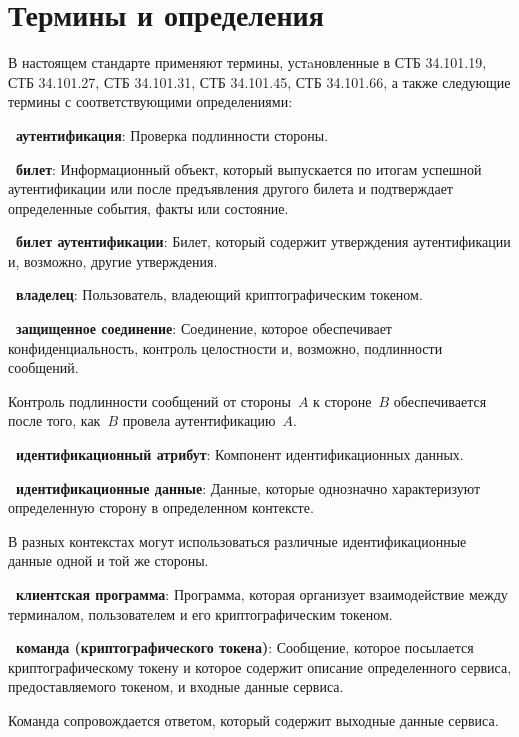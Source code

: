 \chapter{Термины и определения}\label{TERMS}

В настоящем стандарте применяют термины, устaновленные 
в СТБ 34.101.19, СТБ 34.101.27, СТБ 34.101.31, СТБ 34.101.45, 
СТБ 34.101.66, а также следующие термины с соответствующими определениями:

{\bf \thedefctr~аутентификация}:
Проверка подлинности стороны.

{\bf \thedefctr~билет}:
Информационный объект, который выпускается по итогам успешной аутентификации
или после предъявления другого билета и подтверждает определенные 
события, факты или состояние. 

{\bf \thedefctr~билет аутентификации}:
Билет, который содержит утверждения аутентификации и, возможно, другие 
утверждения. 

{\bf \thedefctr~владелец}:
Пользователь, владеющий криптографическим токеном.

{\bf \thedefctr~защищенное соединение}:
Соединение, которое обеспечивает конфиденциальность, 
контроль целостности и, возможно, подлинности сообщений. 

\begin{note*}
Контроль подлинности сообщений от стороны~$A$ к стороне~$B$ 
обеспечивается после того, как~$B$ провела аутентификацию~$A$.
\end{note*}

{\bf \thedefctr~идентификационный атрибут}:
Компонент идентификационных данных. 

{\bf \thedefctr~идентификационные данные}:
Данные, которые однозначно характеризуют определенную 
сторону в определенном контексте. 

\begin{note*}
В разных контекстах могут использоваться различные идентификационные данные
одной и той же стороны.
\end{note*}

{\bf \thedefctr~клиентская программа}:
Программа, которая организует взаимодействие между терминалом, 
пользователем и его криптографическим токеном.

{\bf \thedefctr~команда (криптографического токена)}:
Сообщение, которое посылается 
криптографическому токену и которое содержит описание определенного 
сервиса, предоставляемого токеном, и входные данные сервиса. 
%
\begin{note*}
Команда сопровождается ответом, который содержит выходные данные сервиса.
\end{note*}

